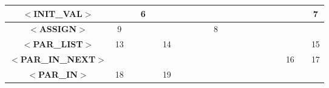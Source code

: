 \documentclass[a4paper,11pt]{article}
\begin{document}
\begin{table}[htbp]
\begin{tabular}{|c||c|c|c|c|c|c|c|c|c|c|c|c|c|c|c|c|c|c|c|c|}
\textbf{$<$INIT\_VAL$>$}     &                             &                        & \multicolumn{1}{c|}{6} &                         &                           &                             &                              &                             &                             &                          &                           &                         &                          &                          &                            &                         &                             &                         &                           & 7                      \\ 
\hline
\textbf{$<$ASSIGN$>$}        & \multicolumn{1}{c|}{9}      &                        &                        &                         &                           &                             &                              &                             &                             & \multicolumn{1}{c|}{8}   &                           &                         &                          &                          &                            &                         &                             &                         &                           & \multicolumn{1}{l|}{}  \\ 
\hline
\textbf{$<$PAR\_LIST$>$}     & \multicolumn{1}{c|}{13}     &                        &                        &                         & \multicolumn{1}{c|}{14}   &                             &                              &                             &                             &                          &                           &                         &                          &                          &                            &                         &                             &                         &                           & 15                     \\ 
\hline
\textbf{$<$PAR\_IN\_NEXT$>$} &                             &                        &                        &                         &                           &                             &                              &                             &                             &                          &                           &                         &                          &                          &                            &                         &                             & \multicolumn{1}{c|}{16} &                           & 17                     \\ 
\hline
\textbf{$<$PAR\_IN$>$}       & \multicolumn{1}{c|}{18}     &                        &                        &                         & \multicolumn{1}{c|}{19}   &                             &                              &                             &                             &                          &                           &                         &                          &                          &                            &                         &                             &                         &                           & \multicolumn{1}{l|}{}  \\ 

\end{tabular}
\end{table}
\end{document}

